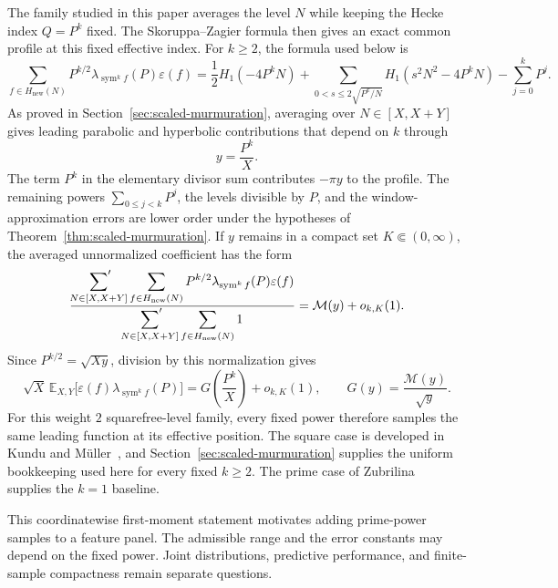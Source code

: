 \documentclass[12pt,reqno]{amsart}
\numberwithin{equation}{section}
\theoremstyle{plain}
\theoremstyle{definition}
\theoremstyle{remark}
\newcommand{\sym}{\operatorname{sym}}
\begin{document}
The family studied in this paper averages the level $N$ while keeping the Hecke index $Q=P^k$ fixed.
The Skoruppa--Zagier formula then gives an exact common profile at this fixed effective index.
For $k\geq2$, the formula used below is~\cite[Theorem~2.1]{KunduMuller2026}
\begin{equation}
\label{eqPrimePowerTraceRoadmap}
\sum_{f\in H_{\mathrm{new}}(N)}
P^{k/2}\lambda_{\sym^k f}(P)\varepsilon(f)
=
\frac12H_1(-4P^kN)
+\sum_{0<s\leq2\sqrt{P^k/N}}H_1(s^2N^2-4P^kN)
-\sum_{j=0}^kP^j.
\end{equation}
As proved in Section~\ref{sec:scaled-murmuration}, averaging over $N\in[X,X+Y]$ gives leading parabolic and hyperbolic contributions that depend on $k$ through
\begin{equation*}
y=\frac{P^k}{X}.
\end{equation*}
The term $P^k$ in the elementary divisor sum contributes $-\pi y$ to the profile.
The remaining powers $\sum_{0\leq j<k}P^j$, the levels divisible by $P$, and the window-approximation errors are lower order under the hypotheses of Theorem~\ref{thm:scaled-murmuration}.
If $y$ remains in a compact set $K\Subset(0,\infty)$, the averaged unnormalized coefficient has the form
\begin{equation}
\label{eqPrimePowerMainTermRoadmap}
\frac{
\displaystyle\sideset{}{'}\sum_{N\in[X,X+Y]}
\sum_{f\in H_{\mathrm{new}}(N)}
P^{k/2}\lambda_{\sym^k f}(P)\varepsilon(f)
}{
\displaystyle\sideset{}{'}\sum_{N\in[X,X+Y]}
\sum_{f\in H_{\mathrm{new}}(N)}1
}
=\mathcal M(y)+o_{k,K}(1).
\end{equation}
Since $P^{k/2}=\sqrt{Xy}$, division by this normalization gives
\begin{equation}
\label{eqPrimePowerNormalizedRoadmap}
\sqrt X\,\mathbb E_{X,Y}
\bigl[\varepsilon(f)\lambda_{\sym^k f}(P)\bigr]
=G\left(\frac{P^k}{X}\right)+o_{k,K}(1),
\qquad
G(y)=\frac{\mathcal M(y)}{\sqrt y}.
\end{equation}
For this weight $2$ squarefree-level family, every fixed power therefore samples the same leading function at its effective position.
The square case is developed in Kundu and M\"uller~\cite{KunduMuller2026}, and Section~\ref{sec:scaled-murmuration} supplies the uniform bookkeeping used here for every fixed $k\geq2$.
The prime case of Zubrilina~\cite{Zubrilina2025} supplies the $k=1$ baseline.

This coordinatewise first-moment statement motivates adding prime-power samples to a feature panel.
The admissible range and the error constants may depend on the fixed power.
Joint distributions, predictive performance, and finite-sample compactness remain separate questions.
\end{document}
